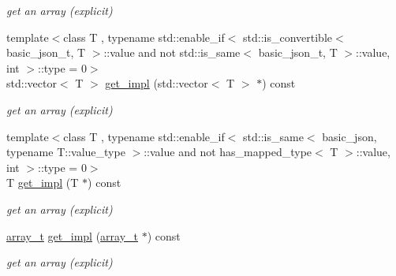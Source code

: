 \begin{DoxyCompactItemize}
\begin{DoxyCompactList}\small\item\em get an array (explicit) \end{DoxyCompactList}\item 
\hypertarget{classnlohmann_1_1basic__json_a7f0f694dd2ab1f77bf9af93b9efbbe2c}{}\label{classnlohmann_1_1basic__json_a7f0f694dd2ab1f77bf9af93b9efbbe2c} 
{\footnotesize template$<$class T , typename std\+::enable\+\_\+if$<$ std\+::is\+\_\+convertible$<$ basic\+\_\+json\+\_\+t, T $>$\+::value and not std\+::is\+\_\+same$<$ basic\+\_\+json\+\_\+t, T $>$\+::value, int $>$\+::type  = 0$>$ }\\std\+::vector$<$ T $>$ \hyperlink{classnlohmann_1_1basic__json_a7f0f694dd2ab1f77bf9af93b9efbbe2c}{get\+\_\+impl} (std\+::vector$<$ T $>$ $\ast$) const
\begin{DoxyCompactList}\small\item\em get an array (explicit) \end{DoxyCompactList}\item 
\hypertarget{classnlohmann_1_1basic__json_a36a2849d28e6e2aba2cc4d1c962e4682}{}\label{classnlohmann_1_1basic__json_a36a2849d28e6e2aba2cc4d1c962e4682} 
{\footnotesize template$<$class T , typename std\+::enable\+\_\+if$<$ std\+::is\+\_\+same$<$ basic\+\_\+json, typename T\+::value\+\_\+type $>$\+::value and not has\+\_\+mapped\+\_\+type$<$ T $>$\+::value, int $>$\+::type  = 0$>$ }\\T \hyperlink{classnlohmann_1_1basic__json_a36a2849d28e6e2aba2cc4d1c962e4682}{get\+\_\+impl} (T $\ast$) const
\begin{DoxyCompactList}\small\item\em get an array (explicit) \end{DoxyCompactList}\item 
\hypertarget{classnlohmann_1_1basic__json_af2f952c98334c2861e5a12484b5a7bce}{}\label{classnlohmann_1_1basic__json_af2f952c98334c2861e5a12484b5a7bce} 
\hyperlink{classnlohmann_1_1basic__json_ab00b882d39306d663c23dab110f5cae0}{array\+\_\+t} \hyperlink{classnlohmann_1_1basic__json_af2f952c98334c2861e5a12484b5a7bce}{get\+\_\+impl} (\hyperlink{classnlohmann_1_1basic__json_ab00b882d39306d663c23dab110f5cae0}{array\+\_\+t} $\ast$) const
\begin{DoxyCompactList}\small\item\em get an array (explicit) \end{DoxyCompactList}\item 
\hypertarget{classnlohmann_1_1basic__json_a36a2849d28e6e2aba2cc4d1c962e4682}{}\label{classnlohmann_1_1basic__json_a36a2849d28e6e2aba2cc4d1c962e4682} 

\end{DoxyCompactItemize}

